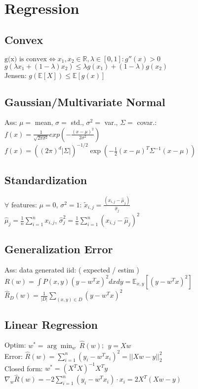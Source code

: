 \section*{ \normalsize{Regression}}
\subsection*{Convex}
$\text{g(x) is convex} \Leftrightarrow x_1,x_2 \in \mathbb{R}, \lambda \in [0,1]: g''(x) > 0$\\
$g(\lambda x_1 + (1-\lambda) x_2) \leq \lambda g(x_1) + (1-\lambda) g(x_2)$\\
Jensen: $g(\mathds{E} [X] )\leq \mathds{E}[g(x)]$
\subsection*{Gaussian/Multivariate Normal}
Ass: $\mu =$ mean, $\sigma =$ std., $\sigma^2 =$ var., $\Sigma=$ covar.:\\
$f(x) = \frac{1}{\sqrt{2\pi\sigma^2}} exp(-\frac{(x-\mu)^2}{2\sigma^2})$\\
$f(x)= ((2\pi)^d |\Sigma|)^{-1/2} \exp(-\frac{1}{2}(x-\mu)^T\Sigma^{-1}(x-\mu))$
\subsection*{Standardization}
$\forall$ features: $\mu = 0$, $\sigma^2=1$: $\tilde{x}_{i,j} = \frac{(x_{i,j}-\hat{\mu}_j)}{\hat{\sigma}_j}$\\
$\hat{\mu}_j = \frac{1}{n}\sum_{i=1}^n x_{i,j}$,  $\hat{\sigma}_j^2 = \frac{1}{n}\sum_{i=1}^n {(x_{i,j}-\hat{\mu}_j)}^2$ 
\subsection*{Generalization Error}
Ass: data generated iid: ( expected / estim )\\
$R(w) =\int P(x,y) (y-w^Tx)^2 dx dy = \mathbb{E}_{x,y}[(y-w^Tx)^2]$\\
$\hat{R}_D(w) = \frac{1}{|D|}\sum_{(x,y)\in D} {(y-w^Tx)^2}$ 

\subsection*{Linear Regression}
Optim: $w^* = \arg\min_w \: \hat{R}(w)$;   $ \; y=Xw$\\
Error: $\hat{R}(w) = \sum_{i=1}^n (y_i - w^Tx_i)^2 = ||Xw-y||^2_2$\\
Closed form: $w^*=(X^T X)^{-1} X^T y$\\
$\nabla_w \hat{R}(w) = -2 \sum_{i=1}^n (y_i-w^T x_i) \cdot x_i = 2X^T (Xw-y)$

